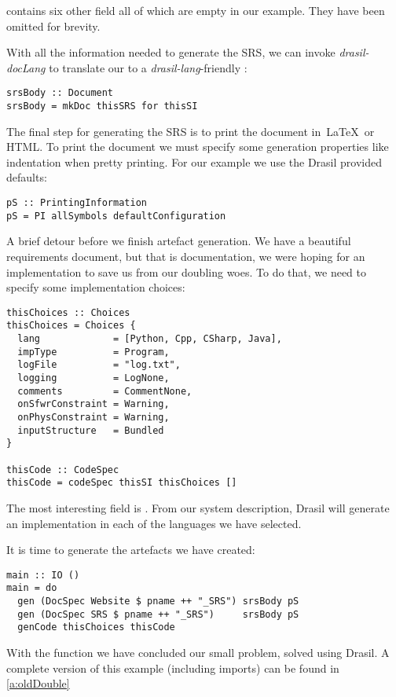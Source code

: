  contains six other field all of which are empty in our example. They have been omitted for brevity.

With all the information needed to generate the SRS, we can invoke \textit{drasil-docLang} to translate our  to a \textit{drasil-lang}-friendly :

\begin{tcolorbox}
\begin{verbatim}
srsBody :: Document
srsBody = mkDoc thisSRS for thisSI
\end{verbatim}
\end{tcolorbox}

The final step for generating the SRS is to print the document in\ \LaTeX\ or HTML. To print the document we must specify some generation properties like indentation when pretty printing. For our example we use the Drasil provided defaults:

\begin{tcolorbox}
\begin{verbatim}
pS :: PrintingInformation
pS = PI allSymbols defaultConfiguration
\end{verbatim}
\end{tcolorbox}

A brief detour before we finish artefact generation. We have a beautiful requirements document, but that is documentation, we were hoping for an implementation to save us from our doubling woes. To do that, we need to specify some implementation choices:

\begin{tcolorbox}[breakable, toprule at break=0pt, bottomrule at break=0pt]
\begin{verbatim}
thisChoices :: Choices
thisChoices = Choices {
  lang             = [Python, Cpp, CSharp, Java],
  impType          = Program,
  logFile          = "log.txt",
  logging          = LogNone,
  comments         = CommentNone,
  onSfwrConstraint = Warning,
  onPhysConstraint = Warning,
  inputStructure   = Bundled
}

thisCode :: CodeSpec
thisCode = codeSpec thisSI thisChoices []
\end{verbatim}
\end{tcolorbox}

The most interesting field is . From our system description, Drasil will generate an implementation in each of the languages we have selected.

It is time to generate the artefacts we have created:

\begin{tcolorbox}
\begin{verbatim}
main :: IO ()
main = do
  gen (DocSpec Website $ pname ++ "_SRS") srsBody pS
  gen (DocSpec SRS $ pname ++ "_SRS")     srsBody pS
  genCode thisChoices thisCode
\end{verbatim}
\end{tcolorbox}

With the  function we have concluded our small problem, solved using Drasil. A complete version of this example (including imports) can be found in \autoref{a:oldDouble}
